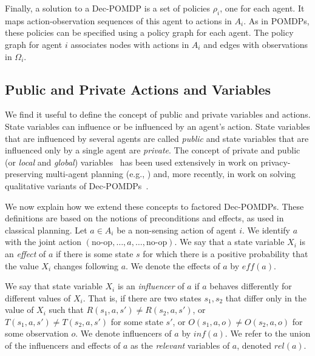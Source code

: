 \documentclass[letterpaper]{article} %
\theoremstyle{definition}
\newcommand{\eliran}[1]{\textbf{[\color{red}ELIRAN:#1]}}
\newcommand{\eff}{\mathit{eff}}
\begin{document}
Finally, a solution to a Dec-POMDP is a set of policies $\rho_i$, one for each agent. It maps action-observation sequences of this agent to actions in $A_i$.
As in POMDPs, these policies can be specified using a policy graph for each agent. The policy graph for agent $i$ associates nodes with actions in $A_i$
and edges with observations in $\Omega_i$. 




\subsection{Public and Private Actions and Variables}

We find it useful to define the concept of public and private variables and actions. State variables can influence or be influenced by an agent's action. State variables that are influenced by several agents are called {\em public} and state variables that are influenced only by a single agent are {\em private}.
The concept of private and public (or \emph{local} and \emph{global}) variables~\cite{FACTOREDPLAN} has been used extensively
in work on privacy-preserving multi-agent planning
(e.g., \cite{NB14,MaliahBS17}) and, more recently, in work on solving qualitative variants of Dec-POMDPs~\cite{QDECPOMDPPLAN1,QDECPOMDPPLAN2}. 

We now explain how we extend these concepts to factored Dec-POMDPs. These definitions are based on the notions of
preconditions and effects, as used in classical planning.
Let $a\in A_i$ be a non-sensing action of agent $i$. We identify $a$ with the joint action $(\mbox{no-op},\ldots, a,\ldots,\mbox{no-op})$. 
We say that a state variable $X_i$ is an {\em effect} of $a$ if there is some state $s$ for which there is a positive probability that the value $X_i$ changes following $a$.
We denote the effects of $a$ by $\eff(a)$.

We say that state variable $X_i$ is an
{\em influencer} of $a$ if $a$ behaves differently for different values of $X_i$.
That is, if there are two states $s_1,s_2$ that differ only in the value of $X_i$ such that $R(s_1,a,s')\neq R(s_2,a,s')$, or $T(s_1,a,s')\neq T(s_2,a,s')$ for some state $s'$, or $O(s_1,a,o)\neq O(s_2,a,o)$ for some observation $o$.
We denote influencers of $a$ by
$inf(a)$.
%
We refer to the union of the influencers and effects of $a$ as
the {\em relevant} variables of $a$,
denoted $rel(a)$. 
\end{document}
